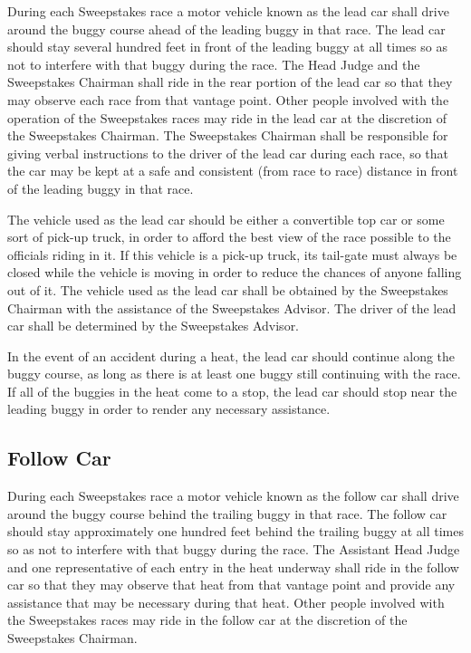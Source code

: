 	During each Sweepstakes race a motor vehicle known as the lead car shall drive
	around the buggy course ahead of the leading buggy in that race. The lead car
	should stay several hundred feet in front of the leading buggy at all times so
	as not to interfere with that buggy during the race. The Head Judge and the
	Sweepstakes Chairman shall ride in the rear portion of the lead car so that
	they may observe each race from that vantage point. Other people involved with
	the operation of the Sweepstakes races may ride in the lead car at the
	discretion of the Sweepstakes Chairman. The Sweepstakes Chairman shall be
	responsible for giving verbal instructions to the driver of the lead car during
	each race, so that the car may be kept at a safe and consistent (from race to
	race) distance in front of the leading buggy in that race.

	The vehicle used as the lead car should be either a convertible top car or some
	sort of pick-up truck, in order to afford the best view of the race possible to
	the officials riding in it. If this vehicle is a pick-up truck, its tail-gate
	must always be closed while the vehicle is moving in order to reduce the
	chances of anyone falling out of it. The vehicle used as the lead car shall be
	obtained by the Sweepstakes Chairman with the assistance of the Sweepstakes
	Advisor. The driver of the lead car shall be determined by the Sweepstakes
	Advisor.

	In the event of an accident during a heat, the lead car should continue along
	the buggy course, as long as there is at least one buggy still continuing with
	the race. If all of the buggies in the heat come to a stop, the lead car should
	stop near the leading buggy in order to render any necessary assistance.

\subsection{Follow Car}

	During each Sweepstakes race a motor vehicle known as the follow car shall
	drive around the buggy course behind the trailing buggy in that race. The
	follow car should stay approximately one hundred feet behind the trailing buggy
	at all times so as not to interfere with that buggy during the race. The
	Assistant Head Judge and one representative of each entry in the heat underway
	shall ride in the follow car so that they may observe that heat from that
	vantage point and provide any assistance that may be necessary during that
	heat. Other people involved with the Sweepstakes races may ride in the follow
	car at the discretion of the Sweepstakes Chairman.

